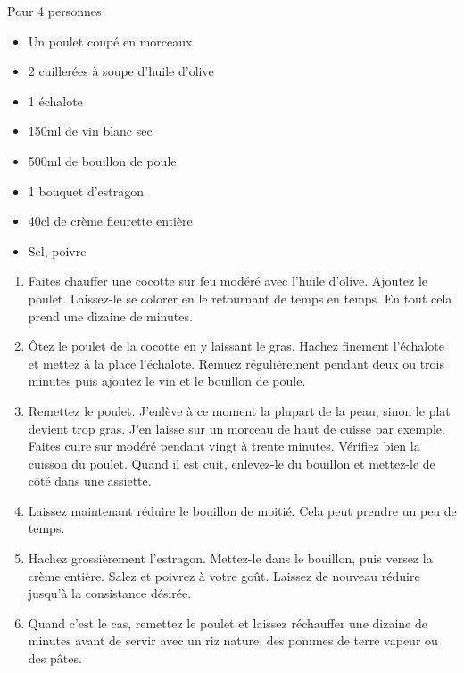 \bigskip
{}
{Pour 4 personnes}{\begin{itemize}
	\item Un poulet coupé en morceaux
	\item 2 cuillerées à soupe d'huile d'olive
	\item 1 échalote
	\item 150ml de vin blanc sec
	\item 500ml de bouillon de poule
	\item 1 bouquet d'estragon
	\item 40cl de crème fleurette entière
	\item Sel, poivre
\end{itemize}}
{\begin{enumerate}
	\item Faites chauffer une cocotte sur feu modéré avec l'huile d'olive. Ajoutez le poulet. Laissez-le se colorer en le retournant de temps en temps. En tout cela prend une dizaine de minutes. 
	\item Ôtez le poulet de la cocotte en y laissant le gras. Hachez finement l'échalote et mettez à la place l'échalote. Remuez régulièrement pendant deux ou trois minutes puis ajoutez le vin et le bouillon de poule.
	\item Remettez le poulet. J'enlève à ce moment la plupart de la peau, sinon le plat devient trop gras. J'en laisse sur un morceau de haut de cuisse par exemple. Faites cuire sur modéré pendant vingt à trente minutes. Vérifiez bien la cuisson du poulet. Quand il est cuit, enlevez-le du bouillon et mettez-le de côté dans une assiette.
	\item Laissez maintenant réduire le bouillon de moitié. Cela peut prendre un peu de temps.
	\item Hachez grossièrement l'estragon. Mettez-le dans le bouillon, puis versez la crème entière. Salez et poivrez à votre goût. Laissez de nouveau réduire jusqu'à la consistance désirée.
	\item Quand c'est le cas, remettez le poulet et laissez réchauffer une dizaine de minutes avant de servir avec un riz nature, des pommes de terre vapeur ou des pâtes.
\end{enumerate}}

